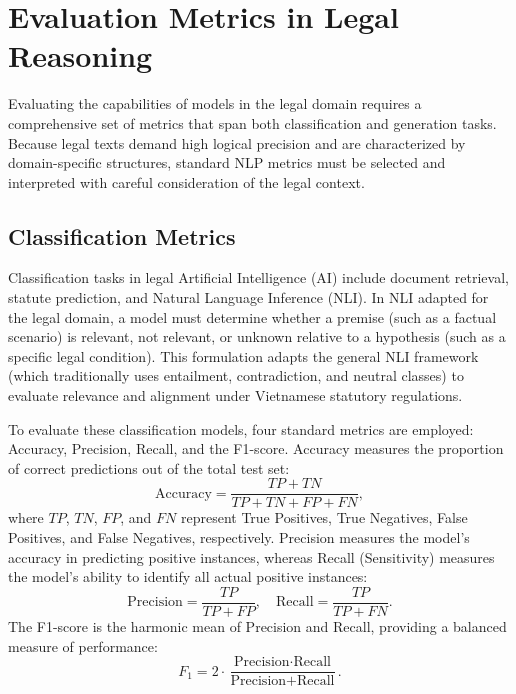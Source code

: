 \section{Evaluation Metrics in Legal Reasoning}

Evaluating the capabilities of models in the legal domain requires a comprehensive set of metrics that span both classification and generation tasks. Because legal texts demand high logical precision and are characterized by domain-specific structures, standard NLP metrics must be selected and interpreted with careful consideration of the legal context.

\subsection{Classification Metrics}

Classification tasks in legal Artificial Intelligence (AI) include document retrieval, statute prediction, and Natural Language Inference (NLI). In NLI adapted for the legal domain, a model must determine whether a premise (such as a factual scenario) is relevant, not relevant, or unknown relative to a hypothesis (such as a specific legal condition). This formulation adapts the general NLI framework (which traditionally uses entailment, contradiction, and neutral classes) to evaluate relevance and alignment under Vietnamese statutory regulations. 

To evaluate these classification models, four standard metrics are employed: Accuracy, Precision, Recall, and the F1-score. 
Accuracy measures the proportion of correct predictions out of the total test set:
\begin{equation}
    \text{Accuracy} = \frac{TP + TN}{TP + TN + FP + FN},
\end{equation}
where $TP$, $TN$, $FP$, and $FN$ represent True Positives, True Negatives, False Positives, and False Negatives, respectively. Precision measures the model's accuracy in predicting positive instances, whereas Recall (Sensitivity) measures the model's ability to identify all actual positive instances:
\begin{equation}
    \text{Precision} = \frac{TP}{TP + FP}, \quad \text{Recall} = \frac{TP}{TP + FN}.
\end{equation}
The F1-score is the harmonic mean of Precision and Recall, providing a balanced measure of performance:
\begin{equation}
    F_1 = 2 \cdot \frac{\text{Precision} \cdot \text{Recall}}{\text{Precision} + \text{Recall}}.
\end{equation}

